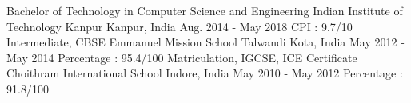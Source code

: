 \vspace{1mm}
\begin{cventries}
  \educationentry
    {Bachelor of Technology in Computer Science and Engineering}
    {Indian Institute of Technology Kanpur}
    {Kanpur, India}
    {Aug. 2014 - May 2018}
    {CPI : 9.7/10}
  \educationentry
    {Intermediate, CBSE}
		{Emmanuel Mission School Talwandi}
		{Kota, India}
		{May 2012 - May 2014}
    {Percentage : 95.4/100}
  \educationentry
    {Matriculation, IGCSE, ICE Certificate}
    {Choithram International School}
    {Indore, India}
    {May 2010 - May 2012}
    {Percentage : 91.8/100}

\end{cventries}

